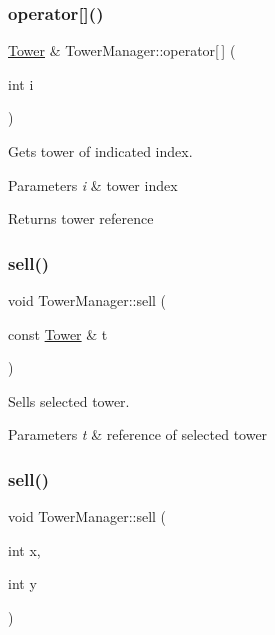 \subsubsection{\texorpdfstring{operator[]()}{operator[]()}}
{\footnotesize\ttfamily \mbox{\hyperlink{class_tower}{Tower}} \& Tower\+Manager\+::operator\mbox{[}$\,$\mbox{]} (\begin{DoxyParamCaption}\item[{int}]{i }\end{DoxyParamCaption})}



Gets tower of indicated index. 


\begin{DoxyParams}{Parameters}
{\em i} & tower index \\
\hline
\end{DoxyParams}
\begin{DoxyReturn}{Returns}
tower reference 
\end{DoxyReturn}
\mbox{\label{class_tower_manager_ab1b232f3361916be0442ccdcaca30df6}} 
\subsubsection{\texorpdfstring{sell()}{sell()}\hspace{0.1cm}{\footnotesize\ttfamily [1/2]}}
{\footnotesize\ttfamily void Tower\+Manager\+::sell (\begin{DoxyParamCaption}\item[{const \mbox{\hyperlink{class_tower}{Tower}} \&}]{t }\end{DoxyParamCaption})}



Sells selected tower. 


\begin{DoxyParams}{Parameters}
{\em t} & reference of selected tower \\
\hline
\end{DoxyParams}
\mbox{\label{class_tower_manager_a3ccb8e040306022ef0ac2d54787a122d}} 
\subsubsection{\texorpdfstring{sell()}{sell()}\hspace{0.1cm}{\footnotesize\ttfamily [2/2]}}
{\footnotesize\ttfamily void Tower\+Manager\+::sell (\begin{DoxyParamCaption}\item[{int}]{x,  }\item[{int}]{y }\end{DoxyParamCaption})}



